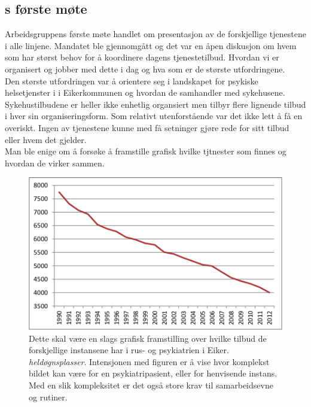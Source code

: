 \documentclass[11pt]{report} %
\begin{document}
                  \subsection{s første møte}\label{sec:agr_1}
                    Arbeidsgruppens første møte\cite{arbgr_mref-1} handlet om presentasjon av de forskjellige tjenestene i alle linjene. Mandatet ble gjennomgått og det var en åpen diskusjon om hvem som har størst behov for å koordinere dagens tjenestetilbud. Hvordan vi er organisert og jobber med dette i dag og hva som er de største utfordringene. \\
                    Den største utfordringen var å orientere seg i landskapet for psykiske helsetjenster i i Eikerkommunen og hvordan de samhandler med sykehusene. Sykehustilbudene er heller ikke enhetlig organsiert men tilbyr flere lignende tilbud i hver sin organiseringsform. Som relativt utenforstående var det ikke lett å få en overiskt. Ingen av tjenestene kunne med få setninger gjøre rede for sitt tilbud eller hvem det gjelder. \\ Man ble enige om å forsøke å framstille grafisk hvilke tjtnester som finnes og hvordan de virker sammen.\\
                    \begin{figure}[ht]
                      \centering
                      \includegraphics{./pix/heldgnpsykplass}%
                      \caption[Framstilling av tjenestetilbudene]%
                      {Dette skal være en slags grafisk framstilling over hvilke tilbud de forskjellige instansene har i rus- og psykiatrien i Eiker. \textit{heldøgnsplasser}. Intensjonen med figuren er å vise hvor komplekst bildet kan være for en psykiatripasient, eller for henvisende instans. Med en slik kompleksitet er det også store krav til samarbeidsevne og rutiner.}
                    \end{figure}    
\end{document}
